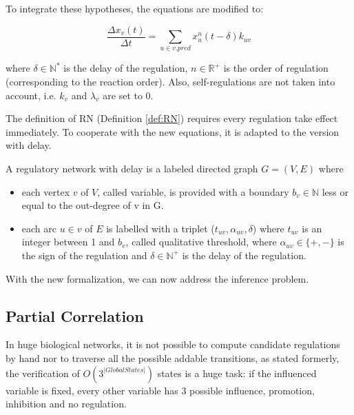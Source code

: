 To integrate these hypotheses, the equations are modified to:

\begin{equation}\label{eq:differenceEquation}
    \frac{\Delta{x_v(t)}}{\Delta t}=\sum_{u\in v.pred}{x_u^{n}(t-\delta)k_{uv}}
\end{equation}


where $\delta\in \mathbb{N}^{*}$ is the delay of the regulation, $n\in \mathbb{R}^{+}$ is the order of regulation (corresponding to the reaction order).
Also, self-regulations are not taken into account, i.e. $k_v$ and $\lambda_v$ are set to 0.

The definition of RN (Definition \ref{def:RN}) requires every regulation take effect immediately.
To cooperate with the new equations, it is adapted to the version with delay.

\begin{definition}
A regulatory network with delay is a labeled directed graph $G=(V,E)$ where 
\begin{itemize}
    \item each vertex $v$ of $V$, called variable, is provided with a boundary $b_v\in \mathbb{N}$ less or equal to the out-degree of v in G.
    \item each arc $u\in v$ of $E$ is labelled with a triplet ($t_{uv}, \alpha_{uv}, \delta$) where $t_{uv}$ is an integer between 1 and $b_v$, called qualitative threshold, where $\alpha_{uv}\in \{+,-\}$ is the sign of the regulation and $\delta\in \mathbb{N^+}$ is the delay of the regulation.
\end{itemize}
\end{definition}

With the new formalization, we can now address the inference problem.

\subsection{Partial Correlation}

In huge biological networks, it is not possible to compute candidate regulations by hand nor to traverse all the possible addable transitions, as stated formerly, the verification of $O(3^{|Global States|})$ states is a huge task: if the influenced variable is fixed, every other variable has 3 possible influence, promotion, inhibition and no regulation.
 
